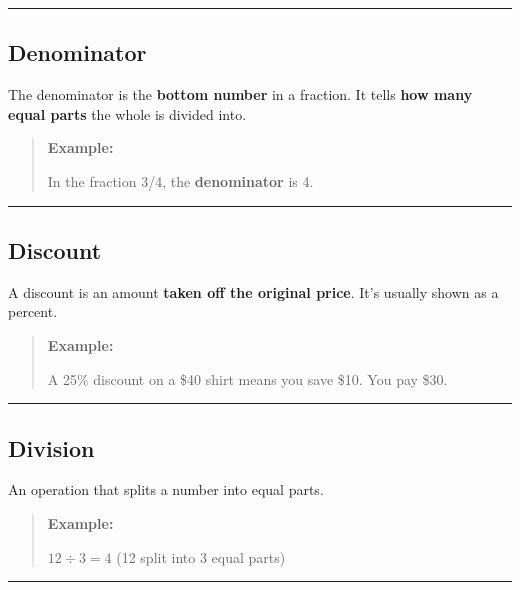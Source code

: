 \documentclass[
  letterpaper,
  DIV=11,
  numbers=noendperiod]{scrreprt}
\begin{document}
\begin{center}\rule{0.5\linewidth}{0.5pt}\end{center}

\subsection*{Denominator}\label{glossary-denominator}

The denominator is the \textbf{bottom number} in a fraction. It tells
\textbf{how many equal parts} the whole is divided into.

\begin{quote}
\textbf{Example:}

In the fraction 3/4, the \textbf{denominator} is 4.
\end{quote}

\begin{center}\rule{0.5\linewidth}{0.5pt}\end{center}

\subsection*{Discount}\label{glossary-discount}

A discount is an amount \textbf{taken off the original price}. It's
usually shown as a percent.

\begin{quote}
\textbf{Example:}

A 25\% discount on a \$40 shirt means you save \$10. You pay \$30.
\end{quote}

\begin{center}\rule{0.5\linewidth}{0.5pt}\end{center}

\subsection*{Division}\label{glossary-division}

An operation that splits a number into equal parts.

\begin{quote}
\textbf{Example:}

\(12 \div 3 = 4\) (12 split into 3 equal parts)
\end{quote}

\begin{center}\rule{0.5\linewidth}{0.5pt}\end{center}
\end{document}
